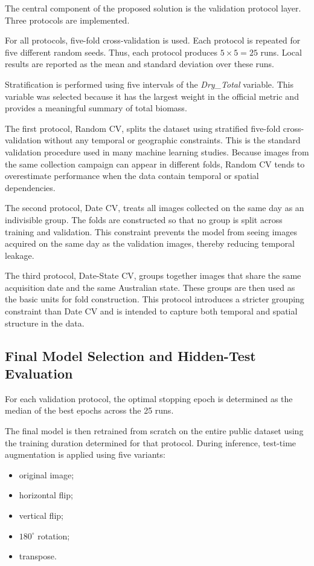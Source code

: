 The central component of the proposed solution is the validation protocol layer. Three protocols are implemented.

For all protocols, five-fold cross-validation is used. Each protocol is repeated for five different random seeds. Thus, each protocol produces $5 \times 5 = 25$ runs. Local results are reported as the mean and standard deviation over these runs.

Stratification is performed using five intervals of the \textit{Dry\_Total} variable. This variable was selected because it has the largest weight in the official metric and provides a meaningful summary of total biomass.

The first protocol, Random CV, splits the dataset using stratified five-fold cross-validation without any temporal or geographic constraints. This is the standard validation procedure used in many machine learning studies. Because images from the same collection campaign can appear in different folds, Random CV tends to overestimate performance when the data contain temporal or spatial dependencies.

The second protocol, Date CV, treats all images collected on the same day as an indivisible group. The folds are constructed so that no group is split across training and validation. This constraint prevents the model from seeing images acquired on the same day as the validation images, thereby reducing temporal leakage.

The third protocol, Date-State CV, groups together images that share the same acquisition date and the same Australian state. These groups are then used as the basic units for fold construction. This protocol introduces a stricter grouping constraint than Date CV and is intended to capture both temporal and spatial structure in the data.

\subsection{Final Model Selection and Hidden-Test Evaluation}

For each validation protocol, the optimal stopping epoch is determined as the median of the best epochs across the 25 runs.

The final model is then retrained from scratch on the entire public dataset using the training duration determined for that protocol. During inference, test-time augmentation is applied using five variants:

\begin{itemize}
    \item original image;
    \item horizontal flip;
    \item vertical flip;
    \item $180^\circ$ rotation;
    \item transpose.
\end{itemize}


